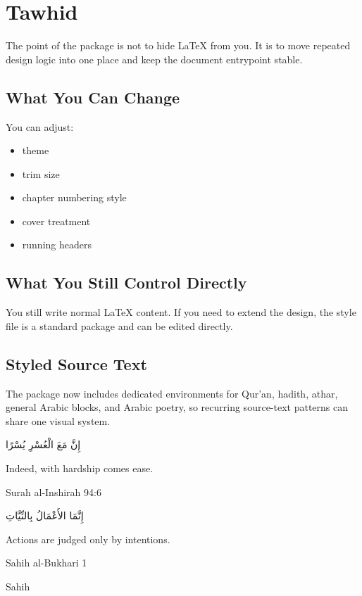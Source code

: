 \chapter{Tawhid}

The point of the package is not to hide LaTeX from you. It is to move repeated
design logic into one place and keep the document entrypoint stable.

\section{What You Can Change}

You can adjust:

\begin{itemize}
  \item theme
  \item trim size
  \item chapter numbering style
  \item cover treatment
  \item running headers
\end{itemize}

\section{What You Still Control Directly}

You still write normal LaTeX content. If you need to extend the design, the
style file is a standard package and can be edited directly.

\section{Styled Source Text}

The package now includes dedicated environments for Qur'an, hadith, athar,
general Arabic blocks, and Arabic poetry, so recurring source-text patterns can
share one visual system.

\begin{quran}
إِنَّ مَعَ الْعُسْرِ يُسْرًا
\begin{translation}Indeed, with hardship comes ease.\end{translation}
\begin{reference}Surah al-Inshirah 94:6\end{reference}
\end{quran}

\begin{hadith}
إِنَّمَا الأَعْمَالُ بِالنِّيَّاتِ
\begin{translation}Actions are judged only by intentions.\end{translation}
\begin{reference}Sahih al-Bukhari 1\end{reference}
\begin{grade}Sahih\end{grade}
\end{hadith}

